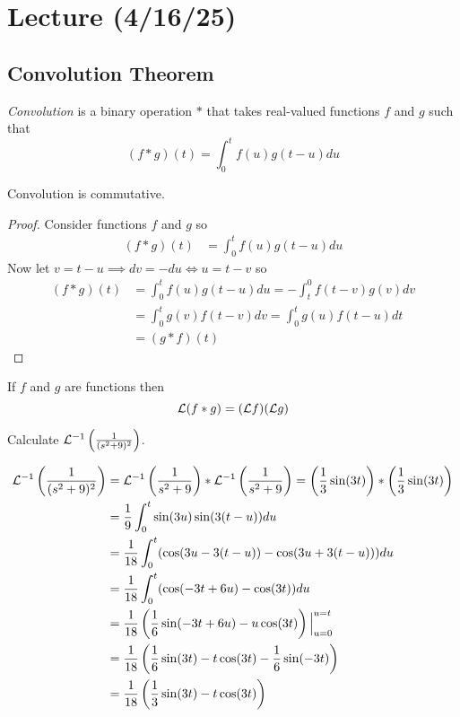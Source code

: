 \documentclass[notes]{subfiles}
\begin{document}
\setcounter{section}{19}
\section{Lecture (4/16/25)}

\subsection{Convolution Theorem}
\begin{definition}
    \textsl{Convolution} is a binary operation $\ast$ that takes real-valued functions $f$ and $g$ such that
    \[
        (f\ast g)(t) = \int_0^t f(u)g(t - u)du
    \]
\end{definition}

\begin{lemma}
    Convolution is commutative.
\end{lemma}
\begin{proof}
    Consider functions $f$ and $g$ so
    \begin{align*}
        (f\ast g)(t)
        &= \int_0^t f(u)g(t - u)du
    \end{align*}
    Now let $v = t - u \implies dv = -du \iff u = t - v$ so
    \begin{align*}
        (f\ast g)(t)
        &= \int_0^t f(u)g(t - u)du
        = -\int_t^0 f(t - v)g(v)dv \\
        &= \int_0^t g(v)f(t - v)dv
        = \int_0^t g(u)f(t - u)dt \\
        &= (g \ast f)(t)
    \end{align*}
\end{proof}

\begin{theorem}
    If $f$ and $g$ are functions then
    \[
        \mathcal{L}(f \ast g) = (\mathcal{L} f)(\mathcal{L} g)
    \]
\end{theorem}

\begin{exercise}
    Calculate $\mathcal{L}^{-1}\left( \frac{1}{(s^2 + 9)^2} \right)$.
\end{exercise}
\begin{solution}
    \begin{align*}
        \mathcal{L}^{-1}\left( \frac{1}{(s^2 + 9)^2} \right)
        &= \mathcal{L}^{-1}\left( \frac{1}{s^2 + 9} \right) \ast \mathcal{L}^{-1}\left( \frac{1}{s^2 + 9} \right)
        = \left(\frac{1}{3}\sin(3t)\right)\ast\left(\frac{1}{3}\sin(3t)\right) \\
        &= \frac{1}{9} \int_0^t \sin(3u)\sin(3(t - u))du \\
        &= \frac{1}{18} \int_0^t ( \cos(3u - 3(t - u)) - \cos(3u + 3(t - u)) )du \\
        &= \frac{1}{18} \int_0^t ( \cos(-3t + 6u) - \cos(3t) )du \\
        &= \frac{1}{18} \left( \frac{1}{6}\sin(-3t + 6u) - u\cos(3t) \right)\Big|_{u = 0}^{u = t} \\
        &= \frac{1}{18} \left( \frac{1}{6}\sin(3t) - t\cos(3t) - \frac{1}{6}\sin(-3t) \right) \\
        &= \frac{1}{18} \left( \frac{1}{3}\sin(3t) - t\cos(3t) \right)
    \end{align*}
\end{solution}
\end{document}
